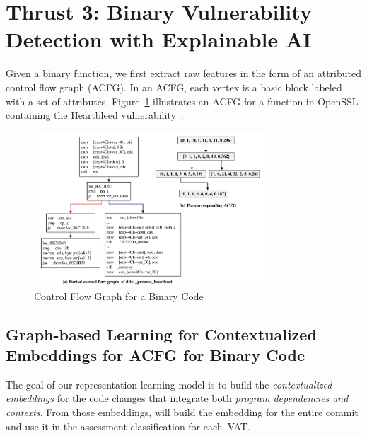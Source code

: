 \section{Thrust 3: Binary Vulnerability Detection with Explainable AI}
\label{sec:thrust3}

Given a binary function, we first extract raw features in the form of
an attributed control flow graph (ACFG). In an ACFG, each vertex is a
basic block labeled with a set of attributes. Figure~\ref{fig:binary}
illustrates an ACFG for a function in OpenSSL containing the
Heartbleed vulnerability~\cite{gimini17}.


\begin{figure}[!hbt]
    \centering
    \includegraphics[width=3.4in]{binary.png}
    \caption{Control Flow Graph for a Binary Code~\cite{gimini17}}
    \label{fig:binary}
\end{figure}

\subsection{Graph-based Learning for Contextualized Embeddings for ACFG for Binary Code}
\label{embedding:sec}

The goal of our representation learning model is to
build the {\em contextualized embeddings} for the code changes that
integrate both {\em program dependencies and contexts}.
From those embeddings, {\tool} will build the embedding for the entire
commit and use it in the assessment classification for each~VAT.



